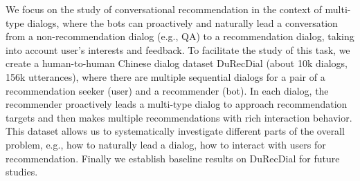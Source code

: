 We focus on the study of conversational recommendation in the context of multi-type dialogs, where the bots can proactively and naturally lead a conversation from a non-recommendation dialog (e.g., QA) to a recommendation dialog, taking into account user's interests and feedback. To facilitate the study of this task, we create a human-to-human Chinese dialog dataset DuRecDial (about 10k dialogs, 156k utterances), where there are multiple sequential dialogs for a pair of a recommendation seeker (user) and a recommender (bot). In each dialog, the recommender proactively leads a multi-type dialog to approach recommendation targets and then makes multiple recommendations with rich interaction behavior. This dataset allows us to systematically investigate different parts of the overall problem, e.g., how to naturally lead a dialog, how to interact with users for recommendation. Finally we establish baseline results on DuRecDial for future studies.
